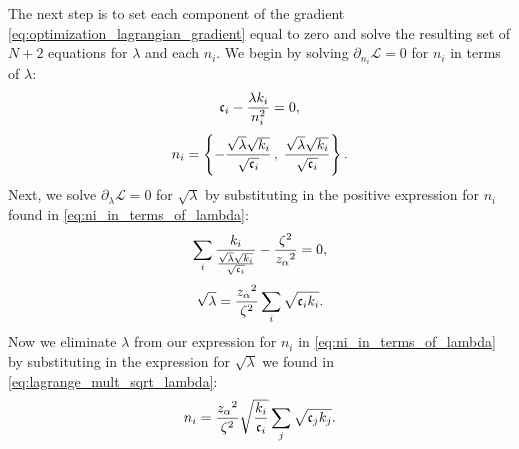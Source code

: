 The next step is to set each component of the gradient \eqref{eq:optimization_lagrangian_gradient} equal to zero and solve the resulting set of $N+2$ equations for $\lambda$ and each $n_i$. We begin by solving $\partial _{n_i}\mathcal{L} = 0$ for $n_i$ in terms of $\lambda$:
    \begin{equation*}
    	\mathfrak{c}_{i}-\frac{\lambda  k_i}{n_i^2}=0,
    \end{equation*}
    \begin{equation}
    \label{eq:ni_in_terms_of_lambda}
        n_i = \left\{ -\frac{\sqrt{\lambda } \sqrt{k_i}}{\sqrt{\mathfrak{c}_{i}}} \,, \; \frac{\sqrt{\lambda } \sqrt{k_i}}{\sqrt{\mathfrak{c}_{i}}}\right\}.
    \end{equation}
Next, we solve $\partial_{\lambda }\mathcal{L} = 0$ for $\sqrt{\lambda}$ by substituting in the positive expression for $n_i$ found in \eqref{eq:ni_in_terms_of_lambda}:
    \begin{equation*}
    	\sum _i \frac{k_i}{\frac{\sqrt{\lambda} \sqrt{k_i}}{\sqrt{\mathfrak{c}_{i}}}}-\frac{\zeta {}^2}{z_{\alpha} {}^2}=0,
    \end{equation*}
    \begin{equation}
    \label{eq:lagrange_mult_sqrt_lambda}
    	\sqrt{\lambda }=\frac{z_{\alpha} {}^2}{\zeta {}^2}\sum_i \sqrt{\mathfrak{c}_{i} k_i}.
    \end{equation}
Now we eliminate $\lambda $ from our expression for $n_i$ in \eqref{eq:ni_in_terms_of_lambda} by substituting in the expression for $\sqrt{\lambda }$ we found in \eqref{eq:lagrange_mult_sqrt_lambda}:
    \begin{equation}
    \label{eq:optimizing_equation_general}
    	n_i=\frac{z_{\alpha} {}^2}{\zeta {}^2}\sqrt{\frac{k_i}{\mathfrak{c}_{i}}}\sum_j \sqrt{\mathfrak{c}_{j} k_j}.
    \end{equation}
    

